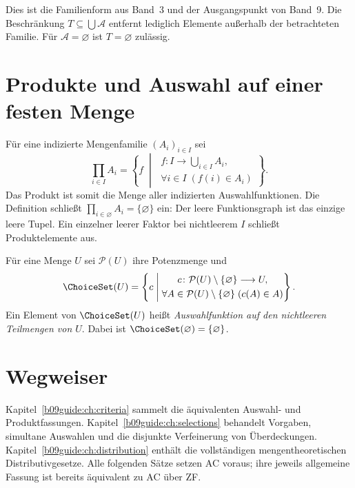 Dies ist die Familienform aus Band~3 und der Ausgangspunkt von Band~9.
Die Beschränkung $T\subseteq\bigcup\mathcal A$ entfernt lediglich
Elemente außerhalb der betrachteten Familie.
Für $\mathcal A=\varnothing$ ist $T=\varnothing$ zulässig.

\section{Produkte und Auswahl auf einer festen Menge}

\begin{definition}
\label{b09guide:def:product}
Für eine indizierte Mengenfamilie $(A_i)_{i\in I}$ sei
\[
 \prod_{i\in I}A_i
 =\left\{f\;\middle|\;
 \begin{gathered}
 f\colon I\longrightarrow\bigcup_{i\in I}A_i,\\
 \forall i\in I\;(f(i)\in A_i)
 \end{gathered}\right\}.
\]
Das Produkt ist somit die Menge aller indizierten Auswahlfunktionen.
Die Definition schließt
$\prod_{i\in\varnothing}A_i=\{\varnothing\}$ ein:
Der leere Funktionsgraph ist das einzige leere Tupel.
Ein einzelner leerer Faktor bei nichtleerem $I$ schließt
Produktelemente aus.
\end{definition}

\begin{definition}
\label{b09guide:def:selector}
Für eine Menge $U$ sei $\mathcal P(U)$ ihre Potenzmenge und
\[
 \ChoiceSet(U)=
 \left\{c\;\middle|\;
 \begin{gathered}
 c\colon\mathcal P(U)\setminus\{\varnothing\}\longrightarrow U,\\
 \forall A\in\mathcal P(U)\setminus\{\varnothing\}\;(c(A)\in A)
 \end{gathered}\right\}.
\]
Ein Element von $\ChoiceSet(U)$ heißt \emph{Auswahlfunktion auf
den nichtleeren Teilmengen von $U$}.
Dabei ist $\ChoiceSet(\varnothing)=\{\varnothing\}$.
\end{definition}

\section{Wegweiser}

Kapitel~\ref{b09guide:ch:criteria} sammelt die äquivalenten
Auswahl- und Produktfassungen.
Kapitel~\ref{b09guide:ch:selections} behandelt Vorgaben,
simultane Auswahlen und die disjunkte Verfeinerung von Überdeckungen.
Kapitel~\ref{b09guide:ch:distribution} enthält die vollständigen
mengentheoretischen Distributivgesetze.
Alle folgenden Sätze setzen AC voraus; ihre jeweils
allgemeine Fassung ist bereits äquivalent zu AC über ZF.
